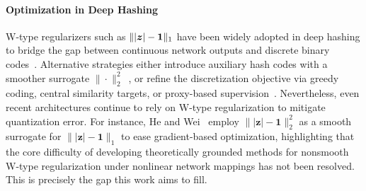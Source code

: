 \paragraph{Optimization in Deep Hashing}
W-type regularizers such as $\||\bm{z}|-\mathbf{1}\|_1$ have been 
widely adopted in deep hashing to bridge the gap between continuous 
network outputs and discrete binary codes~\cite{liuDeepSupervisedHashing,
wang2023deep,zhuDeepHashingNetwork2016}.
Alternative strategies either introduce auxiliary hash codes with a 
smoother surrogate $\|\cdot\|_2^2$~\cite{liDeepSupervisedHashing,
li2017deep,liFeatureLearningBased2016}, or refine the discretization 
objective via greedy coding, central similarity targets, or proxy-based 
supervision~\cite{su2018greedy,yuanCentralSimilarityQuantization2020,
semanticHashCenters2025}. Nevertheless, even recent architectures continue to rely on W-type regularization to mitigate quantization error. For instance,
He and Wei~\cite{he2025mambahash} employ $\||\mathbf{z}|-\mathbf{1}\|_2^2$
as a smooth surrogate for $\||\mathbf{z}|-\mathbf{1}\|_1$ to ease
gradient-based optimization, highlighting that the core difficulty of
developing theoretically grounded methods for nonsmooth W-type
regularization under nonlinear network mappings has not been resolved.
This is precisely the gap this work aims to fill.

